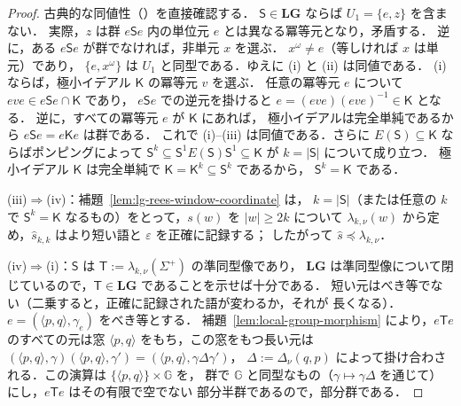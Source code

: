 \documentclass[11pt,a4paper]{ltjsarticle}
\numberwithin{equation}{section}
\theoremstyle{plain}
\theoremstyle{definition}
\theoremstyle{remark}
\newcommand{\eps}{\varepsilon}
\theoremstyle{plain}
\begin{document}
\begin{proof}
古典的な同値性（\cite[Proposition~2.3]{AlmeidaEtAl2009}）を直接確認する．
$\mathsf S\in\mathbf{LG}$ ならば $U_1=\{e,z\}$ を含まない．
実際，$z$ は群 $e\mathsf Se$ 内の単位元 $e$ とは異なる冪等元となり，矛盾する．
逆に，ある $e\mathsf Se$ が群でなければ，非単元 $x$ を選ぶ．
$x^\omega\ne e$（等しければ $x$ は単元）であり，
$\{e,x^\omega\}$ は $U_1$ と同型である．ゆえに (i) と (ii) は同値である．
(i) ならば，極小イデアル $\mathsf K$ の冪等元 $v$ を選ぶ．
任意の冪等元 $e$ について $eve\in e\mathsf Se\cap\mathsf K$ であり，
$e\mathsf Se$ での逆元を掛けると
$e=(eve)(eve)^{-1}\in\mathsf K$ となる．
逆に，すべての冪等元 $e$ が $\mathsf K$ にあれば，
極小イデアルは完全単純であるから $e\mathsf Se=e\mathsf Ke$ は群である．
これで (i)--(iii) は同値である．さらに
$E(\mathsf S)\subseteq\mathsf K$ ならばポンピングによって
$\mathsf S^k\subseteq\mathsf S^1E(\mathsf S)\mathsf S^1\subseteq\mathsf K$
が $k=|\mathsf S|$ について成り立つ．
極小イデアル $\mathsf K$ は完全単純で
$\mathsf K=\mathsf K^k\subseteq\mathsf S^k$ であるから，
$\mathsf S^k=\mathsf K$ である．

(iii)$\Rightarrow$(iv)：補題~\ref{lem:lg-rees-window-coordinate} は，
$k=|\mathsf S|$（または任意の $k$ で $\mathsf S^k=\mathsf K$ なるもの）をとって，$s(w)$ を $|w|\ge2k$ について
$\lambda_{k,\nu}(w)$ から定め，$\widehat s_{k,k}$ はより短い語と $\eps$ を正確に記録する；
したがって $\widehat s\preceq\lambda_{k,\nu}$．

(iv)$\Rightarrow$(i)：$\mathsf S$ は $\mathsf T:=\lambda_{k,\nu}(\Sigma^+)$ の準同型像であり，
$\mathbf{LG}$ は準同型像について閉じているので，$\mathsf T\in\mathbf{LG}$ であることを示せば十分である．
短い元はべき等でない（二乗すると，正確に記録された語が変わるか，それが
長くなる）．$e=(\langle p,q\rangle,\gamma_e)$ をべき等とする．
補題~\ref{lem:local-group-morphism} により，$e\mathsf Te$ のすべての元は窓
$\langle p,q\rangle$ をもち，この窓をもつ長い元は
$(\langle p,q\rangle,\gamma)(\langle p,q\rangle,\gamma')=(\langle p,q\rangle,\gamma\Delta\gamma')$，
$\Delta:=\Delta_\nu(q,p)$ によって掛け合わされる．この演算は $\{\langle p,q\rangle\}\times {\mathbb G}$ を，
群で ${\mathbb G}$ と同型なもの（$\gamma\mapsto\gamma\Delta$ を通じて）にし，$e\mathsf Te$ はその有限で空でない
部分半群であるので，部分群である．
\end{proof}
\end{document}

